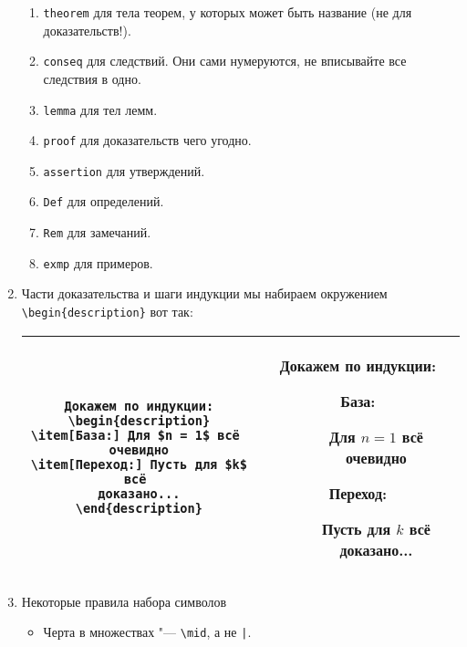 \documentclass[12pt,a4paper]{book}
\newcounter{theorem}[section]
\newcounter{conseq}[theorem]
\begin{document}
\begin{enumerate}
\begin{enumerate}
\item \verb'theorem' для тела теорем, у которых может быть название (не для доказательств!).
\item \verb'conseq' для следствий. Они сами нумеруются, не вписывайте все следствия в одно.
\item \verb'lemma' для тел лемм.
\item \verb'proof' для доказательств чего угодно.
\item \verb'assertion' для утверждений.
\item \verb'Def' для определений.
\item \verb'Rem' для замечаний.
\item \verb'exmp' для примеров.
\end{enumerate}
\item Части доказательства и шаги индукции мы набираем окружением \verb'\begin{description}' вот так:
\begin{center}\begin{tabular}{|c|c|}
\hline
\begin{minipage}{8cm}
\begin{verbatim}
Докажем по индукции:
\begin{description}
\item[База:] Для $n = 1$ всё 
очевидно
\item[Переход:] Пусть для $k$ всё 
доказано...
\end{description}
\end{verbatim}
\end{minipage}
&
\begin{minipage}{7cm}
Докажем по индукции:
\begin{description}
\item[База:] Для $n = 1$ всё очевидно
\item[Переход:] Пусть для $k$ всё доказано...
\end{description}
\end{minipage}\\
\hline\end{tabular}\end{center}
\item Некоторые правила набора символов
\begin{itemize}
\item Черта в множествах "--- \verb'\mid', а не \verb'|'.
\begin{center}\begin{tabular}{|c|c|c|}

\end{tabular}
\end{center}
\end{itemize}
\end{enumerate}
\end{document}

